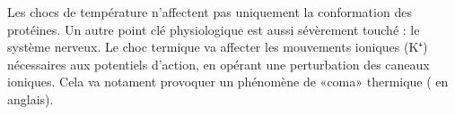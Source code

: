 Les chocs de température n'affectent pas uniquement la conformation des protéines.
Un autre point clé physiologique est aussi sévèrement touché : le système nerveux.
Le choc termique va affecter les mouvements ioniques (K⁺) nécessaires aux potentiels d'action, en opérant une perturbation des caneaux ioniques.
Cela va notament provoquer un phénomène de «coma» thermique ( en anglais)\cite{armstrong2012}.






